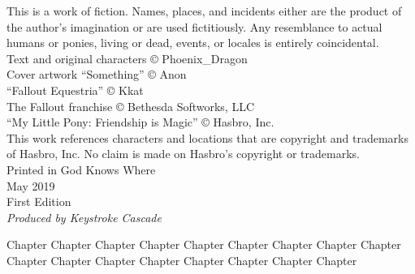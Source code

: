 \clearpage
\thispagestyle{empty}
\null\vspace{2\baselineskip}
\begin{adjustwidth}{4em}{4em}
\begin{center}
\begin{parascale}[0.9]
\noindent
This is a work of fiction. Names, places, and incidents either are the product of the author’s imagination or are used fictitiously. Any resemblance to actual humans or ponies, living or dead, events, or locales is entirely coincidental.\\
\vspace{\baselineskip}
\noindent
Text and original characters © Phoenix\_Dragon\\
Cover artwork “Something” © Anon\\
“Fallout Equestria” © Kkat\\
The Fallout franchise © Bethesda Softworks, LLC\\
“My Little Pony: Friendship is Magic” © Hasbro, Inc.\\
\vspace{\baselineskip}
\noindent
This work references characters and locations that are copyright and trademarks of Hasbro, Inc. No claim is made on Hasbro’s copyright or trademarks.\\
\vspace{11\baselineskip}
\noindent
Printed in God Knows Where\\
May 2019\\
First Edition\\
\vspace{\baselineskip}
\noindent
\textit{Produced by Keystroke Cascade}
\end{parascale}
\end{center}
\end{adjustwidth}

\cleartorecto
\thispagestyle{empty}
\null\vspace{2\baselineskip}
\begin{toc}[0.5]{3em}
{\centering{}\par}
\null\null
Chapter 
Chapter 
Chapter 
Chapter 
Chapter 
Chapter 
Chapter 
Chapter 
Chapter 
Chapter 
Chapter 
Chapter 
Chapter 
Chapter 
Chapter 
Chapter 
Chapter 
\end{toc}

